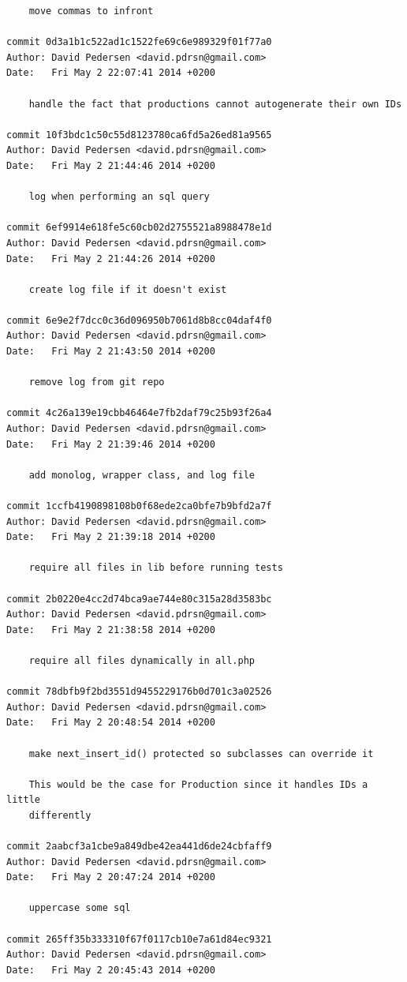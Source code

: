 \documentclass[12pt]{article}
\begin{document}
\begin{verbatim}
    move commas to infront

commit 0d3a1b1c522ad1c1522fe69c6e989329f01f77a0
Author: David Pedersen <david.pdrsn@gmail.com>
Date:   Fri May 2 22:07:41 2014 +0200

    handle the fact that productions cannot autogenerate their own IDs

commit 10f3bdc1c50c55d8123780ca6fd5a26ed81a9565
Author: David Pedersen <david.pdrsn@gmail.com>
Date:   Fri May 2 21:44:46 2014 +0200

    log when performing an sql query

commit 6ef9914e618fe5c60cb02d2755521a8988478e1d
Author: David Pedersen <david.pdrsn@gmail.com>
Date:   Fri May 2 21:44:26 2014 +0200

    create log file if it doesn't exist

commit 6e9e2f7dcc0c36d096950b7061d8b8cc04daf4f0
Author: David Pedersen <david.pdrsn@gmail.com>
Date:   Fri May 2 21:43:50 2014 +0200

    remove log from git repo

commit 4c26a139e19cbb46464e7fb2daf79c25b93f26a4
Author: David Pedersen <david.pdrsn@gmail.com>
Date:   Fri May 2 21:39:46 2014 +0200

    add monolog, wrapper class, and log file

commit 1ccfb4190898108b0f68ede2ca0bfe7b9bfd2a7f
Author: David Pedersen <david.pdrsn@gmail.com>
Date:   Fri May 2 21:39:18 2014 +0200

    require all files in lib before running tests

commit 2b0220e4cc2d74bca9ae744e80c315a28d3583bc
Author: David Pedersen <david.pdrsn@gmail.com>
Date:   Fri May 2 21:38:58 2014 +0200

    require all files dynamically in all.php

commit 78dbfb9f2bd3551d9455229176b0d701c3a02526
Author: David Pedersen <david.pdrsn@gmail.com>
Date:   Fri May 2 20:48:54 2014 +0200

    make next_insert_id() protected so subclasses can override it
    
    This would be the case for Production since it handles IDs a little
    differently

commit 2aabcf3a1cbe9a849dbe42ea441d6de24cbfaff9
Author: David Pedersen <david.pdrsn@gmail.com>
Date:   Fri May 2 20:47:24 2014 +0200

    uppercase some sql

commit 265ff35b333310f67f0117cb10e7a61d84ec9321
Author: David Pedersen <david.pdrsn@gmail.com>
Date:   Fri May 2 20:45:43 2014 +0200


\end{verbatim}
\end{document}
